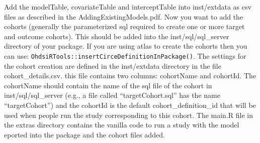 \documentclass[]{article}
\begin{document}
Add the modelTable, covariateTable and interceptTable into inst/extdata
as csv files as described in the AddingExistingModels.pdf. Now you want
to add the cohorts (generally the parameterized sql required to create
one or more target and outcome cohorts). This should be added into the
inst/sql/sql\_server directory of your package. If you are using atlas
to create the cohorts then you can use:
\texttt{OhdsiRTools::insertCirceDefinitionInPackage()}. The settings for
the cohort creation are defined in the inst/extdata directory in the
file cohort\_details.csv. this file contains two columns: cohortName and
cohortId. The cohortName should contain the name of the sql file of the
cohort in inst/sql/sql\_server (e.g., a file called ``targetCohort.sql''
has the name ``targetCohort'') and the cohortId is the default
cohort\_definition\_id that will be used when people run the study
corresponding to this cohort. The main.R file in the extras directory
contains the vanilla code to run a study with the model eported into the
package and the cohort files added.
\end{document}
